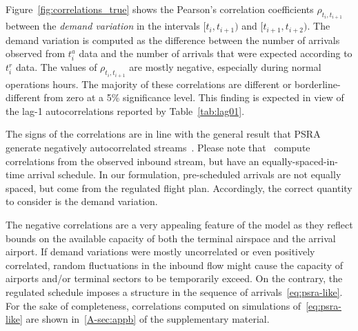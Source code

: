 \documentclass[draft,review]{elsarticle}
\begin{document}
Figure~\ref{fig:correlations_true} shows the Pearson's correlation coefficients \(\rho_{t_i, t_{i+1}}\) between the \emph{demand variation} in the intervals \([t_i, t_{i+1})\) and \([t_{i+1}, t_{i+2})\).
The demand variation is computed as the difference between the number of arrivals observed from \(t^{a}_i\) data and the number of arrivals that were expected according to \(t^{r}_i\) data.
The values of \(\rho_{t_i, t_{i+1}}\) are mostly negative, especially during normal operations hours.
The majority of these correlations are different or borderline-different from zero at a 5\% significance level.
This finding is expected in view of the lag-1 autocorrelations reported by Table~\ref{tab:lag01}.
\begin{kpt}
	The signs of the correlations are in line with the general result that \ac{PSRA} generate negatively autocorrelated streams~\citep{guadagni2011queueing}.
  Please note that~\citet{guadagni2011queueing} compute correlations from the observed inbound stream, but have an equally-spaced-in-time arrival schedule.  In our formulation, pre-scheduled arrivals are not equally spaced, but come from the regulated flight plan.
  Accordingly, the correct quantity to consider is the demand variation.
\end{kpt}


  The negative correlations are a very appealing feature of the model as they reflect bounds on the available capacity of both the terminal airspace and the arrival airport.
  If demand variations were mostly uncorrelated or even positively correlated, random fluctuations in the inbound flow might cause the capacity of airports and/or terminal sectors to be temporarily exceed.
  On the contrary, the regulated schedule imposes a structure in the sequence of arrivals~\eqref{eq:psra-like}.
For the sake of completeness, correlations computed on simulations of~\ref{eq:psra-like} are shown in~\ref{A-sec:appb} of the supplementary material.
\end{document}

